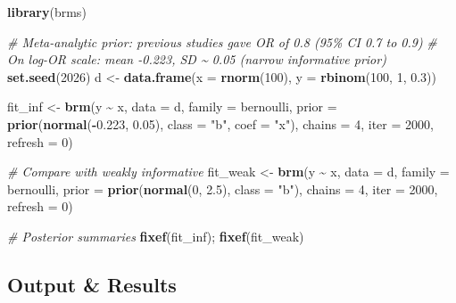 \documentclass[
]{article}
\newenvironment{Shaded}{\begin{snugshade}}{\end{snugshade}}
\newcommand{\AttributeTok}[1]{\textcolor[rgb]{0.13,0.29,0.53}{#1}}
\newcommand{\CommentTok}[1]{\textcolor[rgb]{0.56,0.35,0.01}{\textit{#1}}}
\newcommand{\DecValTok}[1]{\textcolor[rgb]{0.00,0.00,0.81}{#1}}
\newcommand{\FloatTok}[1]{\textcolor[rgb]{0.00,0.00,0.81}{#1}}
\newcommand{\FunctionTok}[1]{\textcolor[rgb]{0.13,0.29,0.53}{\textbf{#1}}}
\newcommand{\NormalTok}[1]{#1}
\newcommand{\OtherTok}[1]{\textcolor[rgb]{0.56,0.35,0.01}{#1}}
\newcommand{\SpecialCharTok}[1]{\textcolor[rgb]{0.81,0.36,0.00}{\textbf{#1}}}
\newcommand{\StringTok}[1]{\textcolor[rgb]{0.31,0.60,0.02}{#1}}
\begin{document}
\begin{Shaded}
\begin{Highlighting}[]
\FunctionTok{library}\NormalTok{(brms)}

\CommentTok{\# Meta{-}analytic prior: previous studies gave OR of 0.8 (95\% CI 0.7 to 0.9)}
\CommentTok{\# On log{-}OR scale: mean {-}0.223, SD \textasciitilde{} 0.05 (narrow informative prior)}
\FunctionTok{set.seed}\NormalTok{(}\DecValTok{2026}\NormalTok{)}
\NormalTok{d }\OtherTok{\textless{}{-}} \FunctionTok{data.frame}\NormalTok{(}\AttributeTok{x =} \FunctionTok{rnorm}\NormalTok{(}\DecValTok{100}\NormalTok{), }\AttributeTok{y =} \FunctionTok{rbinom}\NormalTok{(}\DecValTok{100}\NormalTok{, }\DecValTok{1}\NormalTok{, }\FloatTok{0.3}\NormalTok{))}

\NormalTok{fit\_inf }\OtherTok{\textless{}{-}} \FunctionTok{brm}\NormalTok{(y }\SpecialCharTok{\textasciitilde{}}\NormalTok{ x, }\AttributeTok{data =}\NormalTok{ d, }\AttributeTok{family =}\NormalTok{ bernoulli,}
               \AttributeTok{prior =} \FunctionTok{prior}\NormalTok{(}\FunctionTok{normal}\NormalTok{(}\SpecialCharTok{{-}}\FloatTok{0.223}\NormalTok{, }\FloatTok{0.05}\NormalTok{), }\AttributeTok{class =} \StringTok{"b"}\NormalTok{, }\AttributeTok{coef =} \StringTok{"x"}\NormalTok{),}
               \AttributeTok{chains =} \DecValTok{4}\NormalTok{, }\AttributeTok{iter =} \DecValTok{2000}\NormalTok{, }\AttributeTok{refresh =} \DecValTok{0}\NormalTok{)}

\CommentTok{\# Compare with weakly informative}
\NormalTok{fit\_weak }\OtherTok{\textless{}{-}} \FunctionTok{brm}\NormalTok{(y }\SpecialCharTok{\textasciitilde{}}\NormalTok{ x, }\AttributeTok{data =}\NormalTok{ d, }\AttributeTok{family =}\NormalTok{ bernoulli,}
                \AttributeTok{prior =} \FunctionTok{prior}\NormalTok{(}\FunctionTok{normal}\NormalTok{(}\DecValTok{0}\NormalTok{, }\FloatTok{2.5}\NormalTok{), }\AttributeTok{class =} \StringTok{"b"}\NormalTok{),}
                \AttributeTok{chains =} \DecValTok{4}\NormalTok{, }\AttributeTok{iter =} \DecValTok{2000}\NormalTok{, }\AttributeTok{refresh =} \DecValTok{0}\NormalTok{)}

\CommentTok{\# Posterior summaries}
\FunctionTok{fixef}\NormalTok{(fit\_inf); }\FunctionTok{fixef}\NormalTok{(fit\_weak)}
\end{Highlighting}
\end{Shaded}

\subsection{Output \& Results}\label{output-results}
\end{document}
